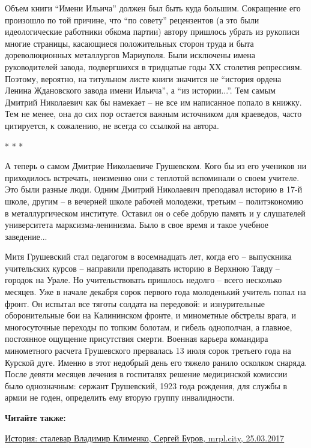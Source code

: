 
Объем книги \enquote{Имени Ильича} должен был быть куда большим. Сокращение его
произошло по той причине, что \enquote{по совету} рецензентов (а это были
идеологические работники обкома партии) автору пришлось убрать из рукописи
многие страницы, касающиеся положительных сторон труда и быта дореволюционных
металлургов Мариуполя. Были исключены имена руководителей завода, подвергшихся
в тридцатые годы ХХ столетия репрессиям. Поэтому, вероятно, на титульном листе
книги значится не \enquote{история ордена Ленина Ждановского завода имени Ильича}, а
\enquote{из истории...}. Тем самым Дмитрий Николаевич как бы намекает – не все им
написанное попало в книжку. Тем не менее, она до сих пор остается важным
источником для краеведов, часто цитируется, к сожалению, не всегда со ссылкой
на автора.

* * *

А теперь о самом Дмитрие Николаевиче Грушевском. Кого бы из его учеников ни
приходилось встречать, неизменно они с теплотой вспоминали о своем учителе. Это
были разные люди. Одним Дмитрий Николаевич преподавал историю в 17-й школе,
другим – в вечерней школе рабочей молодежи, третьим – политэкономию в
металлургическом институте. Оставил он о себе добрую память и у слушателей
университета марксизма-ленинизма. Было в свое время и такое учебное заведение...

Митя Грушевский стал педагогом в восемнадцать лет, когда его – выпускника
учительских курсов – направили преподавать историю в Верхнюю Тавду – городок на
Урале. Но учительствовать пришлось недолго – всего несколько месяцев. Уже в
начале декабря сорок первого года молоденький учитель попал на фронт. Он
испытал все тяготы солдата на передовой: и изнурительные оборонительные бои на
Калининском фронте, и минометные обстрелы врага, и многосуточные переходы по
топким болотам, и гибель однополчан, а главное, постоянное ощущение присутствия
смерти. Военная карьера командира минометного расчета Грушевского прервалась 13
июля сорок третьего года на Курской дуге. Именно в этот недобрый день его
тяжело ранило осколком снаряда. После девяти месяцев лечения в госпиталях
решение медицинской комиссии было однозначным: сержант Грушевский, 1923 года
рождения, для службы в армии не годен, определить ему вторую группу
инвалидности.

\vspace{0.5cm}
\begin{minipage}{0.9\textwidth}
\textbf{Читайте также:} 

\href{https://archive.org/details/25_03_2017.sergij_burov.mrpl_city.istoria_stalevar_vladimir_klimenko}{%
История: сталевар Владимир Клименко, Сергей Буров, mrpl.city, 25.03.2017}
\end{minipage}
\vspace{0.5cm}

